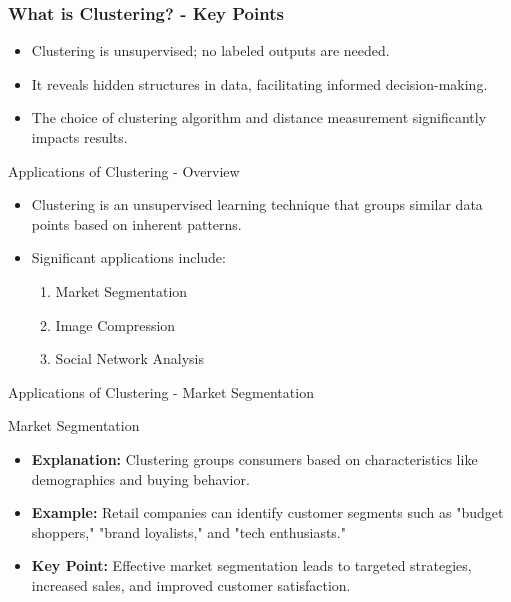 \documentclass[aspectratio=169]{beamer}
\begin{document}
\begin{frame}[fragile]
    \frametitle{What is Clustering? - Key Points}
    \begin{itemize}
        \item Clustering is unsupervised; no labeled outputs are needed.
        \item It reveals hidden structures in data, facilitating informed decision-making.
        \item The choice of clustering algorithm and distance measurement significantly impacts results.
    \end{itemize}
\end{frame}

\begin{frame}[fragile]{Applications of Clustering - Overview}
    \begin{itemize}
        \item Clustering is an unsupervised learning technique that groups similar data points based on inherent patterns.
        \item Significant applications include:
        \begin{enumerate}
            \item Market Segmentation
            \item Image Compression
            \item Social Network Analysis
        \end{enumerate}
    \end{itemize}
\end{frame}

\begin{frame}[fragile]{Applications of Clustering - Market Segmentation}
    \begin{block}{Market Segmentation}
        \begin{itemize}
            \item \textbf{Explanation:} Clustering groups consumers based on characteristics like demographics and buying behavior.
            \item \textbf{Example:} Retail companies can identify customer segments such as "budget shoppers," "brand loyalists," and "tech enthusiasts."
            \item \textbf{Key Point:} Effective market segmentation leads to targeted strategies, increased sales, and improved customer satisfaction.
        \end{itemize}
    \end{block}
\end{frame}
\end{document}
